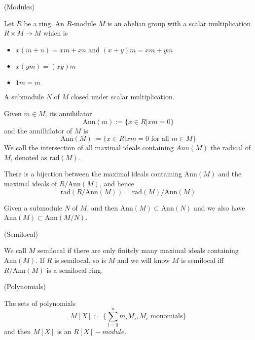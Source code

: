 \documentclass{article}
\begin{document}
\begin{definition}
    (Modules)\par
    Let $R$ be a ring. An $R$-module $M$ is an abelian group with a scalar multiplication
    $R\times M \to M$ which is
    \begin{itemize}
        \item $x(m+n) = xm+xn$ and $(x+y)m = xm + ym$
        \item $x(ym) = (xy)m$
        \item $1m = m$
    \end{itemize}\par
    A submodule $N$ of $M$ closed under scalar multiplication.\par
    Given $m\in M$, its annihilator
    \[
    \text{Ann}(m):=\{x\in R|xm = 0\}
    \]
    and the annilhilator of $M$ is
    \[
    \text{Ann}(M):=\{x\in R|xm = 0\text{ for all }m\in M\}
    \]
    We call the intersection of all maximal ideals containing $Ann(M)$ the radical of $M$, denoted as $\text{rad}(M)$.\par   
\end{definition}

\begin{proposition}
    There is a bijection between the maximal ideals containing $\text{Ann}(M)$ and the maximal ideals of $R/\text{Ann}(M)$, and hence
    \[
    \text{rad}(R/\text{Ann}(M)) = \text{rad}(M) /\text{Ann}(M)
    \]
\end{proposition}

\begin{proposition}
    Given a submodule $N$ of $M$, and then $\text{Ann}(M) \subset \text{Ann}(N)$ and we also have $\text{Ann}(M) \subset \text{Ann}(M/N)$.
\end{proposition}

\begin{definition}
    (Semilocal)\par
    We call $M$ semilocal if there are only finitely many maximal ideals containing $\text{Ann}(M)$. If $R$ is semilocal, so is $M$ and we will know $M$ is semilocal iff $R/\text{Ann}(M)$ is a semilocal ring.
\end{definition}

\begin{definition}
    (Polynomials)\par
    The sets of polynomials
    \[
    M[X] :=\{\sum\limits_{i=0}^n m_iM_i, M_i\text{ monomials}\}
    \]
    and then $M[X]$ is an $R[X]-module$.
\end{definition}
\end{document}

